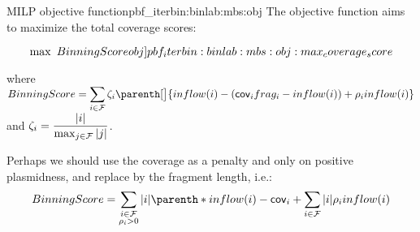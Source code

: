 \begin{definition}{\MBS{} MILP objective function}{pbf_iterbin:binlab:mbs:obj}
  The objective function aims to maximize the total coverage scores:
  \begin{Objective}
    \begin{equation}
      \max ~ BinningScore
      \objlabel{pbf_iterbin:binlab:mbs:obj:max_coverage_score} %
    \end{equation}
  \end{Objective}
  where \(
    \displaystyle BinningScore = %
    \sum_{i \in \Fragments{}} \fzeta{i} \parenth[\big]{ inflow(i) - (\cov{i}\frag{i} - inflow(i)) + \plm{i} inflow(i)}
  \) and \( \displaystyle \zeta_{i} = \frac{ |i| }{ \max_{j \in \mathcal{F}{}} |j| } \).

  \begin{ideabox}
    Perhaps we should use the coverage as a penalty and only on positive plasmidness, and replace \fzeta{} by the fragment length, i.e.:
    \[
      BinningScore =  \sum_{
        \substack{
          i \in \Fragments{} \\
          \plm{i} > 0
        }
      } |i| \parenth*{ inflow(i) - \cov{i} }
      + \sum_{i \in \Fragments{}} |i| \plm{i} inflow(i)
    \]
  \end{ideabox}
\end{definition}